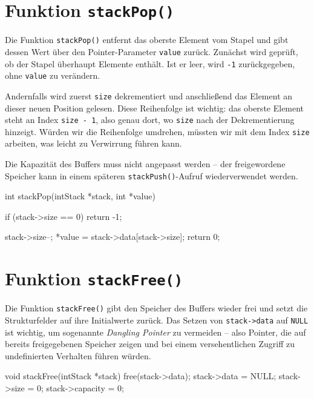 \section*{Funktion \texttt{stackPop()}}

Die Funktion \texttt{stackPop()} entfernt das oberste Element vom
Stapel und gibt dessen Wert über den Pointer-Parameter
\texttt{value} zurück. Zunächst wird geprüft, ob der Stapel überhaupt
Elemente enthält. Ist er leer, wird \texttt{-1} zurückgegeben, ohne
\texttt{value} zu verändern.

Andernfalls wird zuerst \texttt{size} dekrementiert und anschließend
das Element an dieser neuen Position gelesen. Diese Reihenfolge ist wichtig:
das oberste Element steht an Index \texttt{size - 1}, also genau dort,
wo \texttt{size} nach der Dekrementierung hinzeigt. Würden wir die
Reihenfolge umdrehen, müssten wir mit dem Index \texttt{size}
arbeiten, was leicht zu Verwirrung führen kann.

Die Kapazität des Buffers muss nicht angepasst werden -- der freigewordene
Speicher kann in einem späteren \texttt{stackPush()}-Aufruf
wiederverwendet werden.

\begin{codebox}[lang=c, fontsize=\small]
int stackPop(intStack *stack, int *value) {
    if (stack->size == 0) {
        return -1;
    }

    stack->size--;
    *value = stack->data[stack->size];
    return 0;
}
\end{codebox}

\section*{Funktion \texttt{stackFree()}}

Die Funktion \texttt{stackFree()} gibt den Speicher des Buffers wieder
frei und setzt die Strukturfelder auf ihre Initialwerte zurück. Das Setzen
von \texttt{stack->data} auf \texttt{NULL} ist wichtig, um
sogenannte \textit{Dangling Pointer} zu vermeiden -- also Pointer, die auf
bereits freigegebenen Speicher zeigen und bei einem versehentlichen Zugriff
zu undefinierten Verhalten führen würden.

\begin{codebox}[lang=c, fontsize=\small]
void stackFree(intStack *stack) {
    free(stack->data);
    stack->data = NULL;
    stack->size = 0;
    stack->capacity = 0;
}
\end{codebox}




